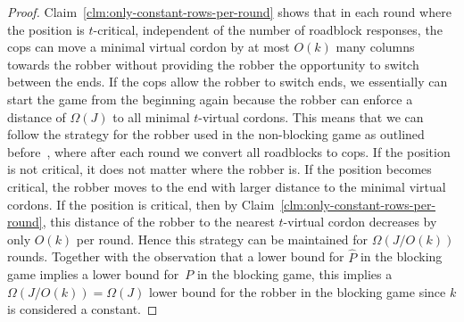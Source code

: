\documentclass[a4paper,english, thm-restate]{lipics-v2021}
\begin{document}
\begin{proof}
	
	\noindent Claim~\ref{clm:only-constant-rows-per-round} shows that in each round where the position is $t$-critical,
	independent of the number of roadblock responses,
	the cops can move a minimal virtual cordon by at most $O(k)$ many columns towards the robber
	without providing the robber the opportunity to switch  between the ends.
	If the cops allow the robber to switch ends, we essentially can start the game from the beginning again
	because the robber can enforce a distance of $\Omega(J)$ to all minimal $t$-virtual cordons.
	This means that we can follow the strategy for the robber used in the non-blocking game as outlined before~\cite{RFJN024},
	where after each round we convert all roadblocks to cops.
	If the position is not critical, it does not matter where the robber is.
	If the position becomes critical, the robber moves to the end with larger
	distance to the minimal virtual cordons.
	If the position is critical,
	then by Claim~\ref{clm:only-constant-rows-per-round}, this distance of the robber to the nearest $t$-virtual cordon decreases by only $O(k)$ per round.
	Hence this strategy can be maintained for $\Omega(J/O(k))$ rounds.
	Together with the observation that a lower bound for $\hat{P}$
	in the blocking game implies a lower bound for~$P$ in the blocking game,
	this implies a $\Omega(J/O(k))=\Omega(J)$ lower bound for the robber in the
	blocking game since $k$ is considered a constant.
\end{proof} 
\end{document}
